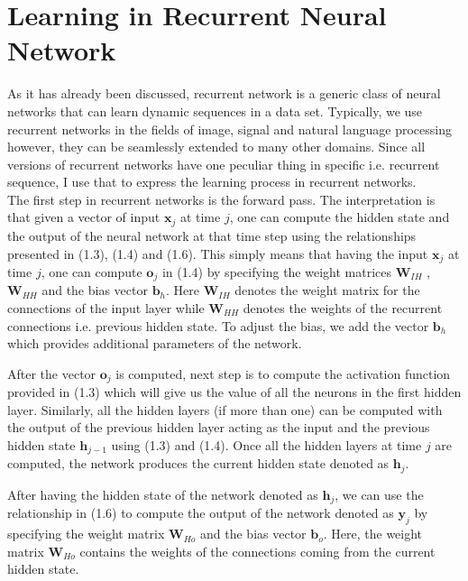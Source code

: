 \section {Learning in Recurrent Neural Network}

As it has already been discussed, recurrent network is a generic class of neural networks that can learn dynamic sequences in a data set. Typically, we use recurrent networks in the fields of image, signal and natural language processing however, they can be seamlessly extended to many other domains. Since all versions of recurrent networks have one peculiar thing in specific i.e. recurrent sequence, I use that to express the learning process in recurrent networks.\\

The first step in recurrent networks is the forward pass. The interpretation is that given a vector of input $\textbf{x}_j$ at time $j$, one can compute the hidden state and the output of the neural network at that time step using the relationships presented in (1.3), (1.4) and (1.6). This simply means that having the input $\textbf{x}_j$ at time $j$, one can compute $\textbf{o}_j$ in (1.4) by specifying the weight matrices $\textbf{W}_{IH}$ , $\textbf{W}_{HH}$ and the bias vector $\textbf{b}_{h}$. Here 
$\textbf{W}_{IH}$ denotes the weight matrix for the connections of the input layer while $\textbf{W}_{HH}$ denotes the weights of the recurrent connections i.e. previous hidden state. To adjust the bias, we add the vector $\textbf{b}_{h}$ which provides additional parameters of the network. 

After the vector $\textbf{o}_j$ is computed, next step is to compute the activation function provided in (1.3) which will give us the value of all the neurons in the first hidden layer. Similarly, all the hidden layers (if more than one) can be computed with the output of the previous hidden layer acting as the input and the previous hidden state $\textbf{h}_{j-1}$ using (1.3) and (1.4). Once all the hidden layers at time $j$ are computed, the network produces the current hidden state denoted as $\textbf{h}_{j}$. 

After having the hidden state of the network denoted as $\textbf{h}_{j}$, we can use the relationship in (1.6) to compute the output of the network denoted as $\textbf{y}_j$ by specifying the weight matrix 
$\textbf{W}_{Ho}$ and the bias vector $\textbf{b}_{o}$. Here, the weight matrix $\textbf{W}_{Ho}$ contains the weights of the connections coming from the current hidden state. 

